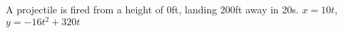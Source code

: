 {A projectile is fired from a height of 0ft, landing 200ft away in 20s.
}
{$x=10t$, $y=-16t^2 + 320t$
}